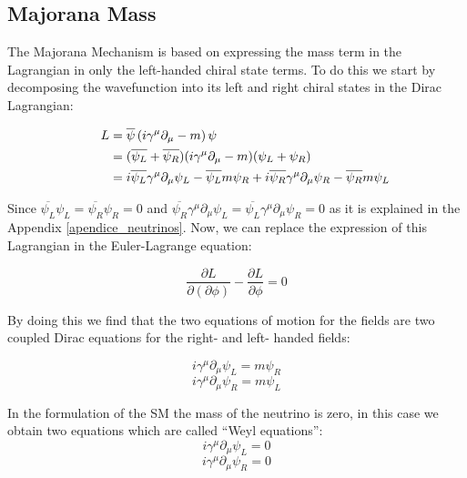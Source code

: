 \subsection{Majorana Mass}

The Majorana Mechanism is based on expressing the mass term in the Lagrangian in only the left-handed chiral state terms.
To do this we start by decomposing the wavefunction into its left and right chiral states in the Dirac Lagrangian: 


\begin{align}
  \phantom{i = j = k}
  &\begin{aligned}
    \mathllap{L} &= \overline{\psi} \left( i \gamma ^\mu \partial_{\mu} - m \right) \psi \\
    \mathllap{}  &= (\overline{\psi_L} + \overline{\psi_R})( i \gamma ^\mu \partial_{\mu} - m)(\psi_L + \psi_R) \\
     \mathllap{} &= i \overline{\psi_L}\gamma^\mu\partial_\mu \psi_L - \overline{\psi_L} m \psi_R +
     i\overline{\psi_R}\gamma^\mu \partial_\mu \psi_R - \overline{\psi_R}m\psi_L
   &\end{aligned}
\end{align}

Since $\overline{\psi_L}\psi_L = \overline{\psi_R}\psi_R = 0$ and $\overline{\psi_R}\gamma^\mu \partial_\mu \psi_L = \overline{\psi_L}\gamma^\mu\partial_\mu \psi_R = 0$
as it is explained in the Appendix \ref{apendice_neutrinos}. Now, we can replace the expression of this Lagrangian in the Euler-Lagrange equation:

\begin{equation}
\frac{\partial L}{\partial (\partial \phi)} - \frac{\partial L}{\partial \phi} = 0
\end{equation}

By doing this we find that the two equations of motion for the fields are two coupled Dirac equations for the right- and left- handed fields:

\begin{equation}\label{majorana_objetive}
i \gamma ^\mu \partial_\mu \psi_L = m \psi_R
\end{equation} 
\begin{equation}\label{majorana_start}
i \gamma ^\mu \partial_\mu \psi_R = m \psi_L
\end{equation} 

In the formulation of the SM the mass of the neutrino is zero, in this case we obtain two equations which are called ``Weyl equations'':
\begin{equation}
i \gamma ^\mu \partial_\mu \psi_L = 0
\end{equation}
\begin{equation}
i \gamma ^\mu \partial_\mu \psi_R = 0
\end{equation}

